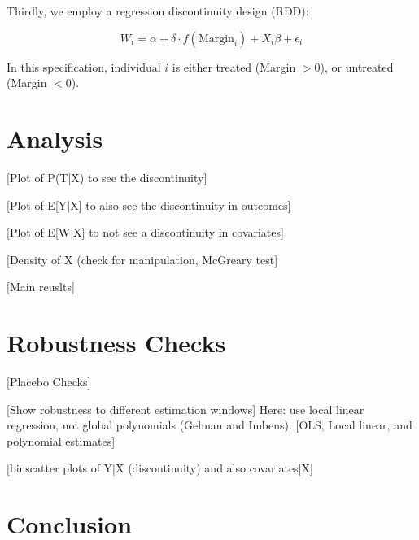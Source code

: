 \documentclass[12pt]{article}
\begin{document}
Thirdly, we employ a regression discontinuity design (RDD): 

\begin{equation}
    W_{i} = \alpha + \delta \cdot f(\text{Margin}_i) + X_i \beta + \epsilon_i
\end{equation}

In this specification, individual $i$ is either treated (Margin $> 0$), or untreated (Margin $< 0$). 

\section{Analysis}

[Plot of P(T|X) to see the discontinuity]

[Plot of E[Y|X] to also see the discontinuity in outcomes]

[Plot of E[W|X] to not see a discontinuity in covariates]

[Density of X (check for manipulation, McGreary test]

[Main reuslts]

\section{Robustness Checks}
[Placebo Checks]

[Show robustness to different estimation windows]
Here: use local linear regression, not global polynomials (Gelman and Imbens).
[OLS, Local linear, and polynomial estimates]

[binscatter plots of Y|X (discontinuity) and also covariates|X]

\section{Conclusion}



\end{document}
